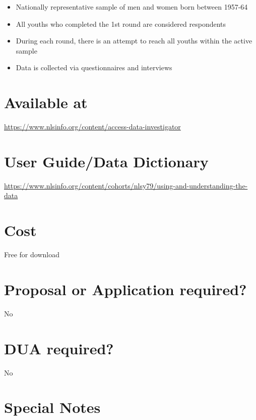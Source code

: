 \documentclass[
]{book}
\providecommand{\tightlist}{%
  \setlength{\itemsep}{0pt}\setlength{\parskip}{0pt}}
\begin{document}
\begin{itemize}
\tightlist
\item
  Nationally representative sample of men and women born between 1957-64
\item
  All youths who completed the 1st round are considered respondents
\item
  During each round, there is an attempt to reach all youths within the active sample
\item
  Data is collected via questionnaires and interviews
\end{itemize}

\hypertarget{available-at-57}{%
\section{Available at}\label{available-at-57}}

\url{https://www.nlsinfo.org/content/access-data-investigator}

\hypertarget{user-guidedata-dictionary-57}{%
\section{User Guide/Data Dictionary}\label{user-guidedata-dictionary-57}}

\url{https://www.nlsinfo.org/content/cohorts/nlsy79/using-and-understanding-the-data}

\hypertarget{cost-57}{%
\section{Cost}\label{cost-57}}

Free for download

\hypertarget{proposal-or-application-required-57}{%
\section{Proposal or Application required?}\label{proposal-or-application-required-57}}

No

\hypertarget{dua-required-57}{%
\section{DUA required?}\label{dua-required-57}}

No

\hypertarget{special-notes-57}{%
\section{Special Notes}\label{special-notes-57}}
\end{document}
